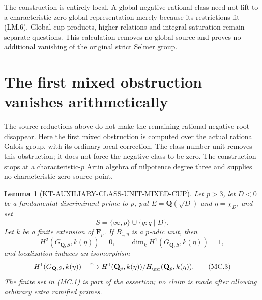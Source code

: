 \documentclass[11pt,a4paper]{article}
\newtheorem{lemma}[theorem]{Lemma}
\theoremstyle{definition}
\begin{document}
The construction is entirely local.  A global
negative rational class need not lift to a
characteristic-zero global representation merely
because its restrictions fit (LM.6).  Global cup
products, higher relations and integral saturation
remain separate questions.  This calculation
removes no global source and proves no additional
vanishing of the original strict Selmer group.



\section{The first mixed obstruction vanishes arithmetically}
\label{sec:kt-global-mixed-cup}

The source reductions above do not make the remaining rational
negative root disappear.  Here the first mixed obstruction is
computed over the actual rational Galois group, with its ordinary
local correction.  The class-number unit removes this obstruction;
it does not force the negative class to be zero.  The construction
stops at a characteristic-$p$ Artin algebra of nilpotence degree
three and supplies no characteristic-zero source point.

\begin{lemma}[KT-AUXILIARY-CLASS-UNIT-MIXED-CUP]
Let $p>3$, let $D<0$ be a fundamental discriminant prime to $p$,
put $E=\mathbf Q(\sqrt D)$ and $\eta=\chi_D$, and set
\[
                  S=\{\infty,p\}\cup\{q:q\mid D\}.
                                                               \tag{MC.1}
\]
Let $k$ be a finite extension of $\mathbf F_p$.
If $B_{1,\eta}$ is a $p$-adic unit, then
\[
 H^2(G_{\mathbf Q,S},k(\eta))=0,\qquad
 \dim_k H^1(G_{\mathbf Q,S},k(\eta))=1,                  \tag{MC.2}
\]
and localization induces an isomorphism
\[
 H^1(G_{\mathbf Q,S},k(\eta))
       \ \xrightarrow{\ \sim\ }
 H^1(\mathbf Q_p,k(\eta))/H^1_{\rm unr}(\mathbf Q_p,k(\eta)).
                                                               \tag{MC.3}
\]
The finite set in (MC.1) is part of the assertion; no claim is
made after allowing arbitrary extra ramified primes.
\end{lemma}
\end{document}
